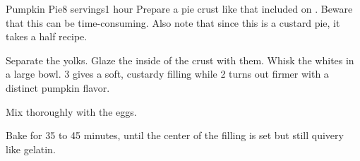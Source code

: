 \documentclass[../Cookbook.tex]{subfiles}
\begin{document}
\begin{recipe}[PumpkinPie]{Pumpkin Pie}{8 servings}{1 hour}
Prepare a pie crust like that included on . Beware that this can be time-consuming. Also note that since this is a custard pie, it takes a half recipe.

Separate the yolks. Glaze the inside of the crust with them.
Whisk the whites in a large bowl. 3 gives a soft, custardy filling while 2 turns out firmer with a distinct pumpkin flavor.

Mix thoroughly with the eggs.

Bake for 35 to 45 minutes, until the center of the filling is set but still quivery like gelatin.


\end{recipe}
\end{document}
